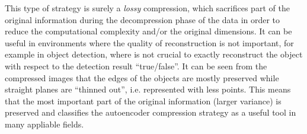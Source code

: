 This type of strategy is surely a \emph{lossy} compression, which sacrifices part of the original information during the decompression phase of the data in order to reduce the computational complexity and/or the original dimensions. It can be useful in environments where the quality of reconstruction is not important, for example in object detection, where is not crucial to exactly reconstruct the object with respect to the detection result ``true/false''. It can be seen from the compressed images that the edges of the objects are mostly preserved while straight planes are ``thinned out'', i.e. represented with less points. This means that the most important part of the original information (larger variance) is preserved and classifies the autoencoder compression strategy as a useful tool in many appliable fields.